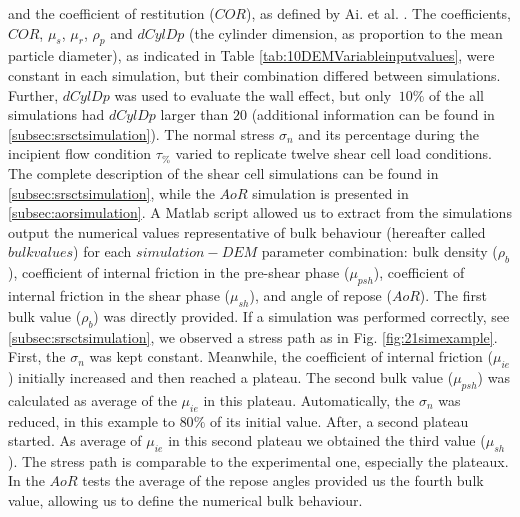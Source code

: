 \documentclass[review]{elsarticle}
\begin{document}
and the coefficient of restitution ($COR$), as defined by Ai. et al. \cite{RefWorks:131}.
The coefficients, $COR$, $\mu_s$, $\mu_r$,
$\rho_p$ and $dCylDp$ (the cylinder dimension, as proportion to the mean
particle diameter), as indicated in Table \ref{tab:10DEMVariableinputvalues}, were constant in each simulation, but their combination differed between
simulations.
Further, $dCylDp$ was used to evaluate the wall effect, but only $~10\%$ of the
all simulations had $dCylDp$ larger than $20$ (additional information can be found in \ref{subsec:srsctsimulation}). 
The normal stress $\sigma_n$ and its
percentage during the incipient flow condition $\tau_{\%}$
varied to replicate twelve shear cell load conditions. 
The complete description of the shear cell simulations can be found in \ref{subsec:srsctsimulation}, 
while the $AoR$ simulation is presented in \ref{subsec:aorsimulation}.
A Matlab script allowed us to extract from the simulations output the numerical
values representative of bulk behaviour (hereafter called $bulk values$)
for each $simulation-DEM$ parameter combination:
bulk density ($\rho_b$),
coefficient of internal friction in the pre-shear phase ($\mu_{psh}$),
coefficient of internal friction in the shear phase ($\mu_{sh}$),
and angle of repose ($AoR$).
The first bulk value ($\rho_b$) was directly provided. 
If a simulation was performed correctly, see \ref{subsec:srsctsimulation}, we
observed a stress path as in Fig. \ref{fig:21simexample}.
First, the $\sigma_n$ was kept constant. 
Meanwhile, the coefficient of internal friction ($\mu_{ie}$) initially increased
and then reached a plateau.
The second bulk value ($\mu_{psh}$) was calculated as average of the $\mu_{ie}$ in this plateau.
Automatically, the $\sigma_n$ was reduced, in this example to $80 \%$ of its
initial value.
After, a second plateau started.
As average of $\mu_{ie}$ in this second plateau we obtained the third value
($\mu_{sh}$).
The stress path is
comparable to the experimental one, especially the plateaux.\\
In the $AoR$ tests the average of the repose angles provided us the fourth bulk
value, allowing us to define the numerical bulk behaviour.
\end{document}
